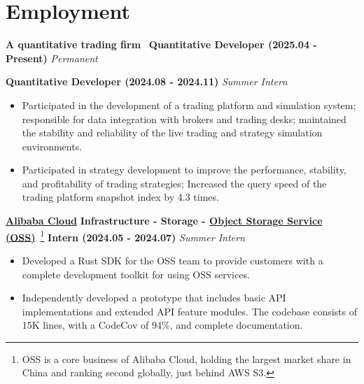 \ifdefined\english

    \section*{Employment}

    \noindent \textbf{A quantitative trading firm}~\footnotemark\label{fn:aum} \textbar{} \textbf{Quantitative Developer (2025.04 - Present)} \hfill \textsl{Permanent}

    \noindent {} \textbar{} \textbf{Quantitative Developer (2024.08 - 2024.11)} \hfill \textsl{Summer Intern}


    \begin{itemize}
        \item Participated in the development of a trading platform and simulation system; responsible for data integration with brokers and trading desks; maintained the stability and reliability of the live trading and strategy simulation environments.
        \item Participated in strategy development to improve the performance, stability, and profitability of trading strategies; Increased the query speed of the trading platform snapshot index by 4.3 times.
    \end{itemize}

    \noindent \textbf{\href{https://www.alibabacloud.com}{Alibaba Cloud}} \textbar{} \textbf{Infrastructure - Storage - \href{https://www.alibabacloud.com/en/product/object-storage-service}{Object Storage Service (OSS)}}~\footnote{OSS is a core business of Alibaba Cloud, holding the largest market share in China and ranking second globally, just behind AWS S3.} \textbar{} \textbf{Intern (2024.05 - 2024.07)} \hfill \textsl{Summer Intern}

    \begin{itemize}
        \item Developed a Rust SDK for the OSS team to provide customers with a complete development toolkit for using OSS services.
        \item Independently developed a prototype that includes basic API implementations and extended API feature modules. The codebase consists of 15K lines, with a CodeCov of 94\%, and complete documentation.
    \end{itemize}

